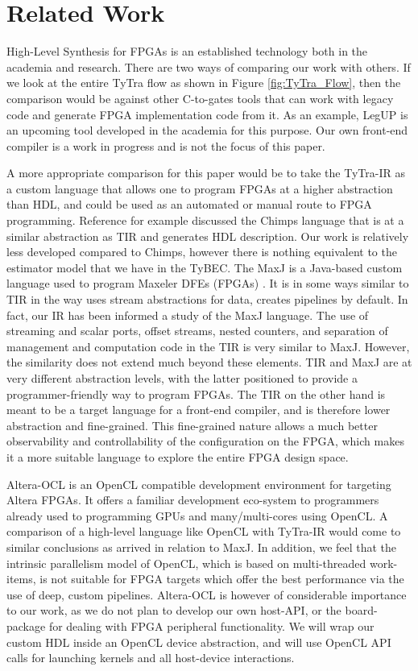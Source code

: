 \documentclass[]{heart2015_WN4Pre}
\begin{document}
\section{Related Work}
\label{sec:relatedWork}
High-Level Synthesis for FPGAs is an established technology both in the academia and research. There are two ways of comparing our work with others. If we look at the entire TyTra flow as shown in Figure \ref{fig:TyTra_Flow}, then the comparison would be against other C-to-gates tools that can work with legacy code and generate FPGA implementation code from it. As an example, LegUP\cite{112.153} is an upcoming tool developed in the academia for this purpose. Our own front-end compiler is a work in progress and is not the focus of this paper. 



A more appropriate comparison for this paper would be to take the TyTra-IR as a custom language that allows one to program FPGAs at a higher abstraction than HDL, and could be used as an automated or manual route to FPGA programming. Reference \cite{123.024} for example discussed the Chimps language that is at a similar abstraction as TIR and generates HDL description. Our work is relatively less developed compared to Chimps, however there is nothing equivalent to the estimator model that we have in the TyBEC. The MaxJ is a Java-based custom language used to program Maxeler DFEs (FPGAs) \cite{112.154}. It is in some ways similar to TIR in the way uses stream abstractions for data, creates pipelines by default. In fact, our IR has been informed a study of the MaxJ language. The use of streaming and scalar ports, offset streams, nested counters, and separation of management and computation code in the TIR is very similar to MaxJ. However, the similarity does not extend much beyond these elements. TIR and MaxJ are at very different abstraction levels, with the latter positioned to provide a programmer-friendly way to program FPGAs. The TIR on the other hand is meant to be a target language for a front-end compiler, and is therefore lower abstraction and fine-grained. This fine-grained nature allows a much better observability and controllability of the configuration on the FPGA, which makes it a more suitable language to explore the entire FPGA design space.

Altera-OCL is an OpenCL compatible development environment for targeting Altera FPGAs\cite{112.151}. It offers a familiar development eco-system to programmers already used to programming GPUs and many/multi-cores using OpenCL. A comparison of a high-level language like OpenCL with TyTra-IR would come to similar conclusions as arrived in relation to MaxJ. In addition, we feel that the intrinsic parallelism model of OpenCL, which is based on multi-threaded work-items, is not suitable for FPGA targets which offer the best performance via the use of deep, custom pipelines. 
Altera-OCL is however of considerable importance to our work, as we do not plan to develop our own host-API, or the board-package for dealing with FPGA peripheral functionality. We will wrap our custom HDL inside an OpenCL device abstraction, and will use OpenCL API calls for launching kernels and all host-device interactions.
\end{document}

